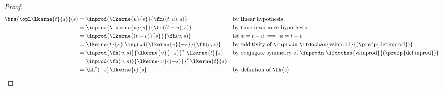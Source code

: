 \begin{proof}

\begin{align*}
  \brs{\opL \lkerne{t}{ s}}(s)
    &= \inprod{\lkerne{u}{ s}}{\fh((t;u), s)}
    && \text{by linear hypothesis}
  \\&= \inprod{\lkerne{u}{ s}}{\fh((t-u), s)}
    && \text{by time-invariance hypothesis}
  \\&= \inprod{\lkerne{(t-v)}{ s}}{\fh(v, s)}
    && \text{let $v=t-u \implies u=t-v$}
  \\&= \lkerne{t}{ s}\; \inprod{\lkerne{v}{-s}}{\fh(v, s)}
    && \text{by additivity of $\inprodn$ \ifdochas{vsinprod}{(\prefp{def:inprod})}}
  \\&= \inprod{\fh(v, s)}{\lkerne{v}{-s}}^\ast \; \lkerne{t}{ s}
    && \text{by conjugate symmetry of $\inprodn$ \ifdochas{vsinprod}{(\prefp{def:inprod})}}
  \\&= \inprod{\fh(v, s)}{\lkerne{v}{(- s)}}^\ast \, \lkerne{t}{ s}
  \\&= \Lh^\ast(- s)\, \lkerne{t}{ s}
    && \text{by definition of $\Lh( s)$}
\end{align*}
\end{proof}

